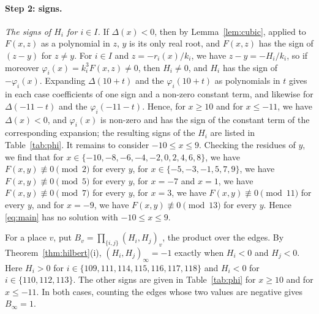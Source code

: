 \documentclass[11pt]{article}
\begin{document}
\paragraph{Step 2: signs.} \emph{The signs of $H_i$ for $i\in I$.} If $\Delta(x)<0$, then by Lemma~\ref{lem:cubic}, applied to $F(x,z)$ as a polynomial in $z$, $y$ is its only real root, and $F(x,z)$ has the sign of $(z-y)$ for $z\neq y$. For $i\in I$ and $z=-r_i(x)/k_i$, we have $z-y=-H_i/k_i$, so if moreover $\varphi_i(x)=k_i^3F(x,z)\neq0$, then $H_i\neq0$, and $H_i$ has the sign of $-\varphi_i(x)$. Expanding $\Delta(10+t)$ and the $\varphi_i(10+t)$ as polynomials in $t$ gives in each case coefficients of one sign and a non-zero constant term, and likewise for $\Delta(-11-t)$ and the $\varphi_i(-11-t)$. Hence, for $x\geq10$ and for $x\leq-11$, we have $\Delta(x)<0$, and $\varphi_i(x)$ is non-zero and has the sign of the constant term of the corresponding expansion; the resulting signs of the $H_i$ are listed in Table~\ref{tab:phi}. It remains to consider $-10\leq x\leq9$. Checking the residues of $y$, we find that for $x\in\{-10,\allowbreak -8,\allowbreak -6,\allowbreak -4,\allowbreak -2,\allowbreak 0,\allowbreak 2,\allowbreak 4,\allowbreak 6,\allowbreak 8\}$, we have $F(x,y)\not\equiv0\pmod{2}$ for every $y$, for $x\in\{-5,\allowbreak -3,\allowbreak -1,\allowbreak 5,\allowbreak 7,\allowbreak 9\}$, we have $F(x,y)\not\equiv0\pmod{5}$ for every $y$, for $x=-7$ and $x=1$, we have $F(x,y)\not\equiv0\pmod{7}$ for every $y$, for $x=3$, we have $F(x,y)\not\equiv0\pmod{11}$ for every $y$, and for $x=-9$, we have $F(x,y)\not\equiv0\pmod{13}$ for every $y$. Hence \eqref{eq:main} has no solution with $-10\leq x\leq9$.

For a place $v$, put $B_v=\prod_{\{i,j\}}(H_i,H_j)_v$, the product over the edges. By Theorem~\ref{thm:hilbert}(i), $(H_i,H_j)_\infty=-1$ exactly when $H_i<0$ and $H_j<0$. Here $H_i>0$ for $i\in\{109,\allowbreak 111,\allowbreak 114,\allowbreak 115,\allowbreak 116,\allowbreak 117,\allowbreak 118\}$ and $H_i<0$ for $i\in\{110,\allowbreak 112,\allowbreak 113\}$. The other signs are given in Table~\ref{tab:phi} for $x\geq10$ and for $x\leq-11$. In both cases, counting the edges whose two values are negative gives $B_\infty=1$.
\end{document}

